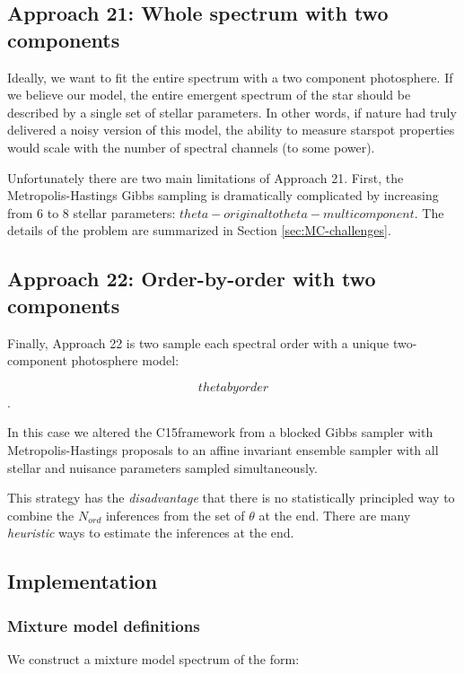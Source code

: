 \documentclass[twocolumn]{emulateapj}%
\newcommand{\iancze}{{\sc C15}}
\begin{document}
\subsection{Approach 21: Whole spectrum with two components}
\label{sec:approach21}

Ideally, we want to fit the entire spectrum with a two component photosphere.  If we believe our model, the entire emergent spectrum of the star should be described by a single set of stellar parameters.  In other words, if nature had truly delivered a noisy version of this model, the ability to measure starspot properties would scale with the number of spectral channels (to some power).

Unfortunately there are two main limitations of Approach 21.  First, the Metropolis-Hastings Gibbs sampling is dramatically complicated by increasing from 6 to 8 stellar parameters: $theta-original to theta-multicomponent$.  The details of the problem are summarized in Section \ref{sec:MC-challenges}.


\subsection{Approach 22: Order-by-order with two components}
\label{sec:approach22}

Finally, Approach 22 is two sample each spectral order with a unique two-component photosphere model: 

$$ theta by order$$. 

In this case we altered the \iancze framework from a blocked Gibbs sampler with Metropolis-Hastings proposals to an affine invariant ensemble sampler with all stellar and nuisance parameters sampled simultaneously.  

This strategy has the \emph{disadvantage} that there is no statistically principled way to combine the $N_{ord}$ inferences from the set of $\theta$ at the end.  There are many \emph{heuristic} ways to estimate the inferences at the end.  


\subsection{Implementation}

\subsubsection{Mixture model definitions}

We construct a mixture model spectrum of the form:
\end{document}
